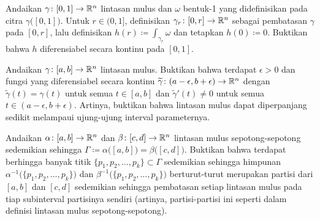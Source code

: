 \begin{exercise}
Andaikan $\gamma \colon [0,1] \to {\mathbb{R}}^n$ lintasan mulus dan
$\omega$ bentuk-1 yang didefinisikan pada citra $\gamma\bigl([0,1]\bigr)$.
Untuk $r \in (0,1]$, definisikan $\gamma_r \colon [0,r] \to {\mathbb{R}}^n$
sebagai pembatasan $\gamma$ pada $[0,r]$, lalu definisikan
$h(r) \coloneqq \int_{\gamma_r} \omega$ dan tetapkan $h(0)\coloneqq 0$.
Buktikan bahwa $h$ diferensiabel secara kontinu pada $[0,1]$.
\end{exercise}

\begin{exercise}
Andaikan $\gamma \colon [a,b] \to {\mathbb{R}}^n$ lintasan mulus.
Buktikan bahwa terdapat $\epsilon > 0$ dan fungsi yang diferensiabel secara kontinu
$\widetilde{\gamma} \colon (a-\epsilon,b+\epsilon) \to {\mathbb{R}}^n$
dengan $\widetilde{\gamma}(t) = \gamma(t)$ untuk semua $t \in [a,b]$
dan $\widetilde{\gamma}'(t) \neq 0$ untuk semua $t \in 
(a-\epsilon,b+\epsilon)$.  Artinya, buktikan bahwa lintasan mulus dapat diperpanjang
sedikit melampaui ujung-ujung interval parameternya.
\end{exercise}

\begin{exercise} 
Andaikan $\alpha \colon [a,b] \to {\mathbb{R}}^n$ dan
$\beta \colon [c,d] \to {\mathbb{R}}^n$ lintasan mulus sepotong-sepotong sedemikian sehingga
$\Gamma \coloneqq \alpha\bigl([a,b]\bigr) = \beta\bigl([c,d]\bigr)$.
Buktikan bahwa terdapat berhingga banyak titik
$\{ p_1,p_2,\ldots,p_k\} \subset \Gamma$ sedemikian sehingga himpunan
$\alpha^{-1}\bigl( \{ p_1,p_2,\ldots,p_k\} \bigr)$
dan
$\beta^{-1}\bigl( \{ p_1,p_2,\ldots,p_k\} \bigr)$
berturut-turut merupakan partisi dari $[a,b]$ dan $[c,d]$ sedemikian sehingga
pembatasan setiap lintasan mulus pada tiap subinterval partisinya sendiri
(artinya, partisi-partisi ini seperti dalam definisi lintasan mulus
sepotong-sepotong).
\end{exercise}

